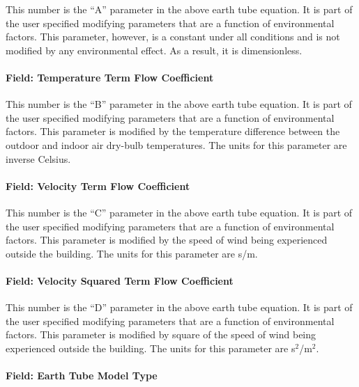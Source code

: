 This number is the ``A'' parameter in the above earth tube equation. It is part of the user specified modifying parameters that are a function of environmental factors. This parameter, however, is a constant under all conditions and is not modified by any environmental effect. As a result, it is dimensionless.

\paragraph{Field: Temperature Term Flow Coefficient}\label{field-temperature-term-flow-coefficient}

This number is the ``B'' parameter in the above earth tube equation. It is part of the user specified modifying parameters that are a function of environmental factors. This parameter is modified by the temperature difference between the outdoor and indoor air dry-bulb temperatures. The units for this parameter are inverse Celsius.

\paragraph{Field: Velocity Term Flow Coefficient}\label{field-velocity-term-flow-coefficient}

This number is the ``C'' parameter in the above earth tube equation. It is part of the user specified modifying parameters that are a function of environmental factors. This parameter is modified by the speed of wind being experienced outside the building. The units for this parameter are s/m.

\paragraph{Field: Velocity Squared Term Flow Coefficient}\label{field-velocity-squared-term-flow-coefficient}

This number is the ``D'' parameter in the above earth tube equation. It is part of the user specified modifying parameters that are a function of environmental factors. This parameter is modified by square of the speed of wind being experienced outside the building. The units for this parameter are s\(^{2}\)/m\(^{2}\).

\paragraph{Field: Earth Tube Model Type}\label{field-earth-tube-model-type}

